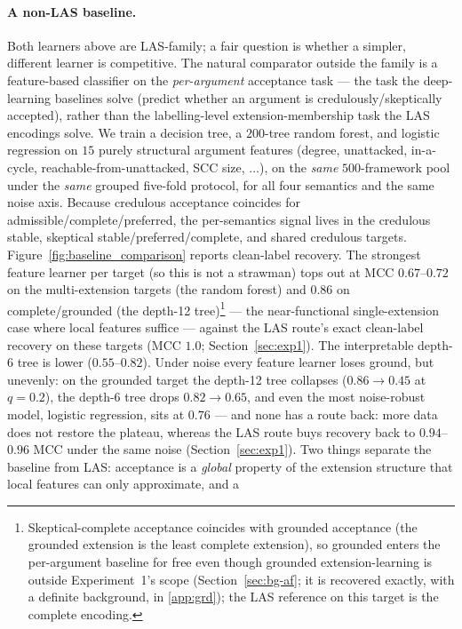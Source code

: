 \documentclass[review,12pt]{elsarticle}
\theoremstyle{definition}
\theoremstyle{remark}
\begin{document}
\paragraph{A non-LAS baseline.} Both learners above are LAS-family; a fair
question is whether a simpler, different learner is competitive. The natural
comparator outside the family is a feature-based classifier on the
\emph{per-argument} acceptance task --- the task the deep-learning baselines
solve (predict whether an argument is credulously/skeptically accepted), rather
than the labelling-level extension-membership task the LAS encodings solve. We
train a decision tree, a $200$-tree random forest, and logistic regression on
$15$ purely structural argument features (degree, unattacked, in-a-cycle,
reachable-from-unattacked, SCC size, $\dots$), on the \emph{same} $500$-framework
pool under the \emph{same} grouped five-fold protocol, for all four semantics and
the same noise axis. Because credulous acceptance coincides for
admissible/complete/preferred, the per-semantics signal lives in the credulous
stable, skeptical stable/preferred/complete, and shared credulous targets.
Figure~\ref{fig:baseline_comparison} reports clean-label recovery. The
strongest feature learner per target (so this is not a strawman) tops out at
MCC $0.67$--$0.72$ on the multi-extension targets (the random forest) and
$0.86$ on complete/grounded (the depth-12 tree)\footnote{Skeptical-complete acceptance coincides with
grounded acceptance (the grounded extension is the least complete extension),
so grounded enters the per-argument baseline for free even though grounded
extension-learning is outside Experiment~1's scope (Section~\ref{sec:bg-af};
it is recovered exactly, with a definite background, in \ref{app:grd});
the LAS reference on this target is the complete encoding.} --- the
near-functional single-extension case where local features suffice ---
against the LAS route's exact clean-label recovery on these targets
(MCC $1.0$; Section~\ref{sec:exp1}). The interpretable depth-6
tree is lower ($0.55$--$0.82$). Under noise every feature learner loses
ground, but unevenly: on the grounded target the depth-12 tree collapses
($0.86\to0.45$ at $q{=}0.2$), the depth-6 tree drops $0.82\to0.65$, and even
the most noise-robust model, logistic regression, sits at $0.76$ --- and none
has a route back: more data does not restore the plateau, whereas the LAS
route buys recovery back to $0.94$--$0.96$ MCC under the same noise
(Section~\ref{sec:exp1}). Two
things separate the baseline from LAS: acceptance is a \emph{global} property
of the extension structure that local features can only approximate, and a
\end{document}
